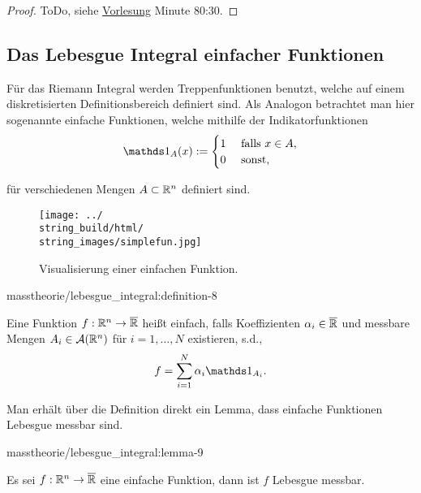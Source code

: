 \begin{proof}
 ToDo, siehe \href{https://www.fau.tv/clip/id/40563}{Vorlesung} Minute 80:30.
\end{proof}


\subsection{Das Lebesgue Integral einfacher Funktionen}
\label{\detokenize{masstheorie/lebesgue_integral:das-lebesgue-integral-einfacher-funktionen}}
\par
Für das Riemann Integral werden Treppenfunktionen benutzt, welche auf einem diskretisierten Definitionsbereich definiert sind. Als Analogon betrachtet man hier sogenannte einfache Funktionen, welche mithilfe der Indikatorfunktionen
\begin{align*}
\bone_A(x):=
\begin{cases}
1&\text{ falls }x\in A,\\
0&\text{ sonst,}
\end{cases}
\end{align*}
\par
für verschiedenen Mengen \(A\subset \mathbb{R}^n\) definiert sind.

\begin{figure}[htbp]
\centering


\noindent\texttt{[image: ../\\string\_build/html/\\string\_images/simplefun.jpg]}
\caption{Visualisierung einer einfachen Funktion.}\label{\detokenize{masstheorie/lebesgue_integral:fig-simplefun}}\end{figure}
\begin{definition}{}{masstheorie/lebesgue_integral:definition-8}



\par
Eine Funktion \(f:\mathbb{R}^n\to\overline{\mathbb{R}}\) heißt einfach, falls Koeffizienten \(\alpha_i\in\overline{\mathbb{R}}\) und messbare Mengen \(A_i\in\mathcal{A}(\mathbb{R}^n)\) für \(i=1,\ldots,N\) existieren, s.d.,
\begin{align*}
f = \sum_{i=1}^N \alpha_i \bone_{A_i}.
\end{align*}\end{definition}

\par
Man erhält über die Definition direkt ein Lemma, dass einfache Funktionen Lebesgue messbar sind.
\begin{lemma}{}{masstheorie/lebesgue_integral:lemma-9}



\par
Es sei \(f:\mathbb{R}^n\to\overline{\mathbb{R}}\) eine einfache Funktion, dann ist \(f\) Lebesgue messbar.
\end{lemma}

